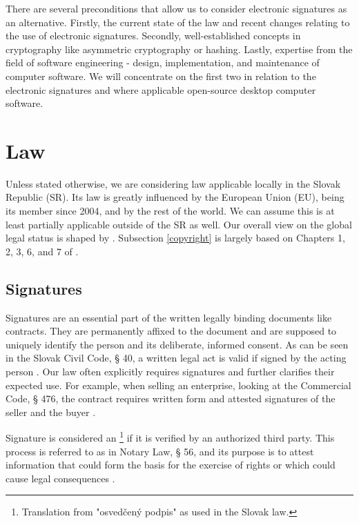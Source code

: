 \documentclass[thesismargins, english, thesislinespacing, onelinechapterstyle, upjsfrontpage]{rnthesis}
\begin{document}
There are several preconditions that allow us to consider electronic signatures as an alternative.
Firstly, the current state of the law and recent changes relating to the use of electronic signatures. Secondly, well-established concepts in cryptography like asymmetric cryptography or hashing. Lastly, expertise from the field of software engineering - design, implementation, and maintenance of computer software.
We will concentrate on the first two in relation to the electronic signatures and where applicable open-source desktop computer software.

\section{Law}

Unless stated otherwise, we are considering law applicable locally in the Slovak Republic (SR).
Its law is greatly influenced by the European Union (EU), being its member since 2004, and by the rest of the world.
We can assume this is at least partially applicable outside of the SR as well.
Our overall view on the global legal status is shaped by \cite{law}.
Subsection \ref{copyright} is largely based on Chapters 1, 2, 3, 6, and 7 of \cite{osslicensing}.

\subsection{Signatures}

Signatures are an essential part of the written legally binding documents like contracts.
They are permanently affixed to the document and are supposed to uniquely identify the person and its deliberate, informed consent.
As can be seen in the Slovak Civil Code, § 40, a written legal act is valid if signed by the acting person \cite{civilcode}.
Our law often explicitly requires signatures and further clarifies their expected use.
For example, when selling an enterprise, looking at the Commercial Code, § 476, the contract requires written form and attested signatures of the seller and the buyer \cite{commercialcode}.

Signature is considered an \footnote{Translation from "osvedčený podpis" as used in the Slovak law.} if it is verified by an authorized third party.
This process is referred to as  in Notary Law, § 56, and its purpose is to attest information that could form the basis for the exercise of rights or which could cause legal consequences \cite{notarylaw}.
\end{document}
